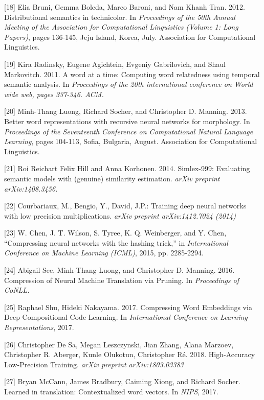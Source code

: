 \documentclass{article} %
\begin{document}
{\small{[18] Elia Bruni, Gemma Boleda, Marco Baroni, and Nam Khanh
  Tran. 2012. Distributional semantics in technicolor. In {\it
    Proceedings of the 50th Annual Meeting of the Association for
    Computational Linguistics (Volume 1: Long Papers)}, pages 136-145,
  Jeju Island, Korea, July. Association for Computational
  Linguistics.}

\small{[19] Kira Radinsky, Eugene Agichtein, Evgeniy Gabrilovich, and
  Shaul Markovitch. 2011. A word at a time: Computing word relatedness
  using temporal semantic analysis. In {\it Proceedings of the 20th
  international conference on World wide web, pages 337-346. ACM.}}

\small{[20] Minh-Thang Luong, Richard Socher, and Christopher
  D. Manning. 2013. Better word representations with recursive neural
  networks for morphology.  In {\it Proceedings of the Seventeenth
  Conference on Computational Natural Language Learning}, pages
  104-113, Sofia, Bulgaria, August. Association for Computational
  Linguistics.}

\small{[21] Roi Reichart Felix Hill and Anna Korhonen. 2014.
  Simlex-999: Evaluating semantic models with (genuine) similarity
  estimation. {\it arXiv preprint arXiv:1408.3456.}}

\small{[22] Courbariaux, M., Bengio, Y., David, J.P.: Training deep
  neural networks with low precision multiplications. {\it arXiv preprint
  arXiv:1412.7024 (2014)}}

\small{[23] W. Chen, J. T. Wilson, S. Tyree, K. Q. Weinberger, and
  Y. Chen, ``Compressing neural networks with the hashing trick,'' in
  {\it International Conference on Machine Learning (ICML)}, 2015,
  pp. 2285-2294.}

\small{[24] Abigail See, Minh-Thang Luong, and Christopher
  D. Manning. 2016. Compression of Neural Machine Translation via
  Pruning. In {\it Proceedings of CoNLL.}}

\small{[25] Raphael Shu, Hideki Nakayama. 2017. Compressing Word
  Embeddings via Deep Compositional Code Learning. In {\it
    International Conference on Learning Representations}, 2017.}

\small{[26] Christopher De Sa, Megan Leszczynski, Jian Zhang, Alana
  Marzoev, Christopher R. Aberger, Kunle Olukotun, Christopher
  R\'e. 2018. High-Accuracy Low-Precision Training. {\it arXiv
    preprint arXiv:1803.03383}}

\small{[27] Bryan McCann, James Bradbury, Caiming Xiong, and Richard
  Socher. Learned in translation: Contextualized word vectors. In {\it
    NIPS}, 2017.}

}
\end{document}
